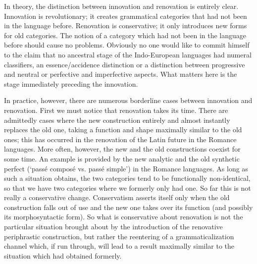 In theory, the distinction between innovation and renovation is entirely clear. Innovation is revolutionary; it creates grammatical categories that had not been in the language before. Renovation is conservative; it only introduces new forms for old categories. The notion of a category which had not been in the language before should cause no problems. Obviously no one would like to commit himself to the claim that no ancestral stage of the Indo-European languages had numeral classifiers, an essence/accidence distinction or a distinction between progressive and neutral or perfective and imperfective aspects. What matters here is the stage immediately preceding the innovation.

In practice, however, there are numerous borderline cases between innovation and renovation. First we must notice that renovation takes its time. There are admittedly cases where the new construction entirely and almost instantly replaces the old one, taking a function and shape maximally similar to the old ones; this has occurred in the renovation of the Latin future in the Romance languages. More often, however, the new and the old constructions coexist for some time. An example is provided by the new analytic and the old synthetic perfect (‘passé composé vs. passé simple’) in the Romance languages. As long as such a situation obtains, the two categories tend to be functionally non-identical, so that we have two categories where we formerly only had one. So far this is not really a conservative change. Conservatism asserts itself only when the old construction falls out of use and the new one takes over its function (and possibly its morphosyntactic form). So what is conservative about renovation is not the particular situation brought about by the introduction of the renovative periphrastic construction, but rather the reentering of a grammaticalization channel which, if run through, will lead to a result maximally similar to the situation which had obtained formerly.

